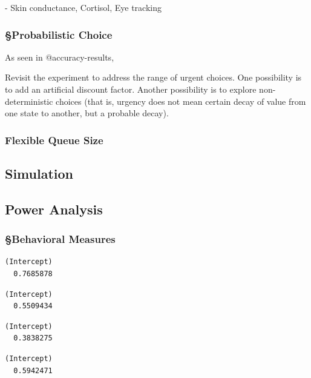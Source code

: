 \documentclass[
]{report}
\begin{document}
- Skin conductance, Cortisol, Eye tracking

\hypertarget{probabilistic-choice}{%
\subsubsection{§Probabilistic Choice}\label{probabilistic-choice}}

As seen in @accuracy-results,

Revisit the experiment to address the range of urgent choices. One
possibility is to add an artificial discount factor. Another possibility
is to explore non-deterministic choices (that is, urgency does not mean
certain decay of value from one state to another, but a probable decay).

\hypertarget{flexible-queue-size}{%
\subsubsection{Flexible Queue Size}\label{flexible-queue-size}}

\hypertarget{simulation-2}{%
\subsection{Simulation}\label{simulation-2}}

\hypertarget{power-analysis-1}{%
\subsection{Power Analysis}\label{power-analysis-1}}

\hypertarget{behavioral-measures-1}{%
\subsubsection{§Behavioral Measures}\label{behavioral-measures-1}}

\begin{verbatim}
(Intercept) 
  0.7685878 
\end{verbatim}

\begin{verbatim}
(Intercept) 
  0.5509434 
\end{verbatim}

\begin{verbatim}
(Intercept) 
  0.3838275 
\end{verbatim}

\begin{verbatim}
(Intercept) 
  0.5942471 
\end{verbatim}
\end{document}
